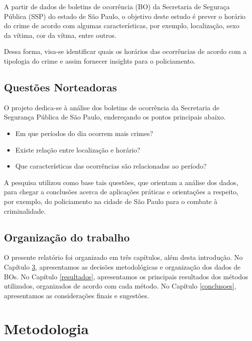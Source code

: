 \documentclass[
  12pt,
]{report}
\providecommand{\tightlist}{%
  \setlength{\itemsep}{0pt}\setlength{\parskip}{0pt}}
\begin{document}
A partir de dados de boletins de ocorrência (BO) da Secretaria de Seguraça Pública (SSP) do estado de São Paulo, o objetivo deste estudo é prever o horário do crime de acordo com algumas características, por exemplo, localização, sexo da vítima, cor da vítma, entre outros.

Dessa forma, visa-se identificar quais os horários das ocorrências de acordo com a tipologia do crime e assim fornecer insights para o policiamento.

\hypertarget{questuxf5es-norteadoras}{%
\section{Questões Norteadoras}\label{questuxf5es-norteadoras}}

O projeto dedica-se à análise dos boletins de ocorrência da Secretaria de Segurança Pública de São Paulo, endereçando os pontos principais abaixo.

\begin{itemize}
\tightlist
\item
  Em que períodos do dia ocorrem mais crimes?
\item
  Existe relação entre localização e horário?
\item
  Que características das ocorrências são relacionadas ao período?
\end{itemize}

A pesquisa utilizou como base tais questões, que orientam a análise dos dados, para chegar a conclusões acerca de aplicações práticas e orientações a respeito, por exemplo, do policiamento na cidade de São Paulo para o combate à criminalidade.

\hypertarget{organizauxe7uxe3o-do-trabalho}{%
\section{Organização do trabalho}\label{organizauxe7uxe3o-do-trabalho}}

O presente relatório foi organizado em três capítulos, além desta introdução. No Capítulo \ref{metodologia}, apresentamos as decisões metodológicas e organização dos dados de BOs. No Capítulo \ref{resultados}, apresentamos os principais resultados dos métodos utilizados, organizados de acordo com cada método. No Capítulo \ref{conclusoes}, apresentamos as considerações finais e sugestões.

\hypertarget{metodologia}{%
\chapter{Metodologia}\label{metodologia}}
\end{document}
